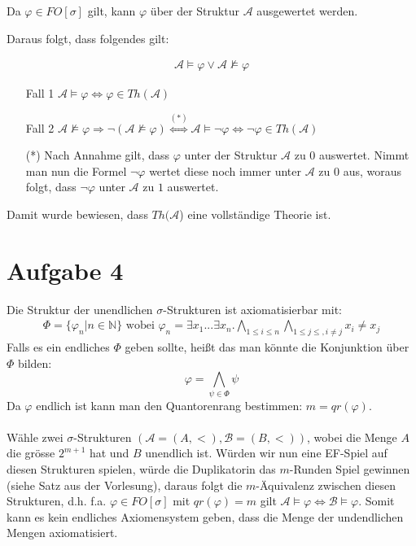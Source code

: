 \documentclass[a4paper,10pt]{article}
\newcommand{\N}{\mathbb{N}}
\begin{document}
\begin{enumerate}[(i)]
\begin{enumerate}[(i)]
	Da $\varphi \in FO[\sigma]$ gilt, kann $\varphi$ über der Struktur $\mathcal{A}$ ausgewertet werden.
	
	Daraus folgt, dass folgendes gilt:
	
	\begin{align*}
		\mathcal{A} \vDash \varphi \vee \mathcal{A} \nvDash \varphi
	\end{align*}
	
	\begin{itemize}
		\item[Fall 1]
			$\mathcal{A} \vDash \varphi \Leftrightarrow \varphi \in Th(\mathcal{A})$
		\item[Fall 2]
			$\mathcal{A} \nvDash \varphi 
			\Rightarrow \neg (\mathcal{A} \nvDash \varphi)
			\overset{(*)}{\Leftrightarrow} \mathcal{A} \vDash \neg \varphi \Leftrightarrow \neg \varphi \in Th(\mathcal{A})$\\
		\item[(*)]
			Nach Annahme gilt, dass $\varphi$ unter der Struktur $\mathcal{A}$ zu $0$ auswertet. Nimmt man nun die Formel 
			$\neg \varphi$ wertet diese noch immer unter $\mathcal{A}$ zu $0$ aus, woraus folgt, dass $\neg \varphi$ unter $\mathcal{A}$ zu 				$1$ auswertet.
	\end{itemize}
	
	Damit wurde bewiesen, dass $Th(\mathcal{A}$) eine vollständige Theorie ist.
\end{enumerate}

\section*{Aufgabe 4}
Die Struktur der unendlichen $\sigma$-Strukturen ist axiomatisierbar mit:
\begin{align*}
	\Phi = \{\varphi_n | n \in \N \} \text{ wobei } \varphi_n = \exists x_1 ... \exists x_n. \bigwedge_{1  \le i \le n} \bigwedge_{1 \le j \le, i \neq j} x_i \neq x_j
\end{align*}
Falls es ein endliches $\Phi$ geben sollte, heißt das man könnte die Konjunktion über $\Phi$ bilden:
\[\varphi = \bigwedge_{\psi \in \Phi} \psi \]
Da $\varphi$ endlich ist kann man den Quantorenrang bestimmen: $m = qr(\varphi)$. \\
\\
Wähle zwei $\sigma$-Strukturen $(\mathcal{A} = (A,<),\mathcal{B} = (B,<))$, wobei die Menge $A$ die grösse $2^{m+1}$ hat und $B$ unendlich ist. Würden wir nun eine EF-Spiel auf diesen Strukturen spielen, würde die Duplikatorin das $m$-Runden Spiel gewinnen (siehe Satz aus der Vorlesung), daraus folgt die $m$-Äquivalenz zwischen diesen Strukturen, d.h. f.a. $\varphi \in FO[\sigma] $ mit $qr(\varphi) = m$ gilt $\mathcal{A} \vDash \varphi \Leftrightarrow \mathcal{B} \vDash \varphi$. Somit kann es kein endliches Axiomensystem geben, dass die Menge der undendlichen Mengen axiomatisiert.

\end{enumerate}
\end{document}
